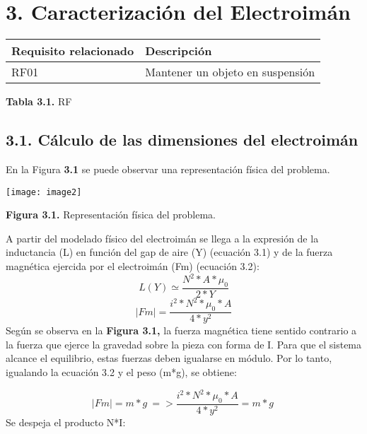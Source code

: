 \documentclass{article} %
\begin{document}
\noindent 
\section{3. Caracterizaci\'{o}n del Electroim\'{a}n}

\begin{tabular}{|p{2.1in}|p{2.1in}|} \hline 
Requisito relacionado & Descripci\'{o}n \\ \hline 
RF01 & Mantener un objeto en suspensi\'{o}n \\ \hline 
\end{tabular}

\textbf{Tabla 3.1. }RF

\noindent 
\subsection{3.1. C\'{a}lculo de las dimensiones del electroim\'{a}n}

\noindent En la Figura \textbf{3.1} se puede observar una representaci\'{o}n f\'{i}sica del problema.

\noindent \texttt{[image: image2]}

\noindent \textbf{Figura 3.1. }Representaci\'{o}n f\'{i}sica del problema.\textbf{ }

\noindent 

\noindent 

\noindent A partir del modelado f\'{i}sico del electroim\'{a}n se llega a la expresi\'{o}n de la inductancia (L) en funci\'{o}n del gap de aire (Y) (ecuaci\'{o}n 3.1) y de la fuerza magn\'{e}tica ejercida por el electroim\'{a}n (Fm) (ecuaci\'{o}n 3.2):
\begin{equation} \label{GrindEQ__3_1_} 
L(Y)\simeq \frac{N^2*A*{\mu }_0}{2*Y} 
\end{equation} 
\begin{equation} \label{GrindEQ__3_2_} 
\left|Fm\right|=\frac{i^2*N^2*{\mu }_0*A}{4*y^2} 
\end{equation} 
Seg\'{u}n se observa en la \textbf{Figura 3.1, }la fuerza magn\'{e}tica tiene sentido contrario a la fuerza que ejerce la gravedad sobre la pieza con forma de I. Para que el sistema alcance el equilibrio, estas fuerzas deben igualarse en m\'{o}dulo. Por lo tanto, igualando la ecuaci\'{o}n 3.2 y  el peso (m*g), se obtiene:

\noindent 
\[\left|Fm\right|=m*g\ =>\frac{i^2*N^2*{\mu }_0*A}{4*y^2}=m*g\ \] 
Se despeja el producto N*I:    
\end{document}
